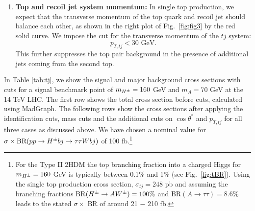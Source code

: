 \begin{enumerate}
\item\textbf{Top and recoil jet system momentum:} In single top production, we expect that the transverse momentum of the top quark and recoil jet should balance each other, as shown in the right plot of Fig.~\ref{fig:fig3} by the red solid curve.  We impose the cut for the transverse momentum of  the $tj$ system: 
\begin{equation}
p_{T,tj} < 30 \text{ GeV}.
\label{eqPT}
\end{equation}
This further suppresses the top pair background in the presence of additional jets coming from the   second top.
 
\end{enumerate}



In Table \ref{tab:tj}, we show the signal and  major  background cross sections with cuts for a signal benchmark point of $m_{H^{\pm}} = 160$ GeV and $m_A =  70$ GeV at the 14 TeV LHC. The first row shows the total cross section before cuts,  calculated using MadGraph.    The following rows show the cross sections after applying the identification cuts, mass cuts and the additional cuts on $\cos\theta^*$ and $p_{T,tj}$ for all three cases as discussed above. We have chosen a nominal value for $\sigma \times \text{BR}( p p  \rightarrow H^{\pm} b j \rightarrow \tau \tau W bj)$ of 100 fb.\footnote{For the Type II 2HDM the top branching fraction into a charged Higgs for $m_{H^{\pm}}=160$ GeV is typically  between 0.1\% and 1\% (see Fig.~\ref{fig:tBR}). Using the single top production cross section, $\sigma_{tj}=248$ pb \cite{Kidonakis:2012db} and assuming  the branching fractions BR$(H^{\pm} \rightarrow AW^{\pm})  = 100 \%$ and BR$(A \rightarrow \tau\tau)=8.6 \%$ leads to the stated $\sigma\times$ BR of around 21 $-$ 210 fb.  }



